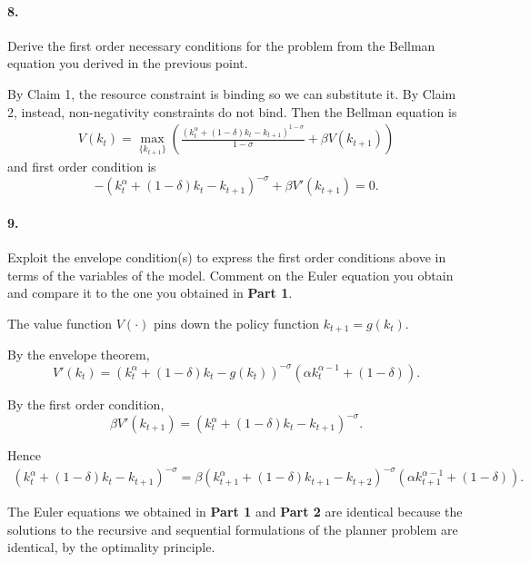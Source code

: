 \documentclass[dvipsnames,11pt]{article}
\begin{document}
\paragraph{8.} Derive the first order necessary conditions for the problem from the Bellman equation you derived in the previous point.  

                \begin{solution}

                    By Claim 1, the resource constraint is binding so we can substitute it. By Claim 2, instead, non-negativity constraints do not bind. Then the Bellman equation is 
\begin{gather*}
V(k_t)=\max_{\{k_{t+1}\}}\left(\frac{(k_t^\alpha+(1-\delta)k_t-k_{t+1})^{1-\sigma}}{1-\sigma}+\beta V(k_{t+1})\right) 
\end{gather*}
and first order condition is 
\begin{equation*}
    -(k_t^\alpha+(1-\delta)k_t-k_{t+1})^{-\sigma}+\beta V'(k_{t+1}) =0.
\end{equation*}
                    
                \end{solution}

\paragraph{9.} Exploit the envelope condition(s) to express the first order conditions above in terms of the variables of the model. Comment on the Euler equation you obtain and compare it to the one you obtained in \textbf{Part 1}.  


                \begin{solution}
The value function $V(\cdot)$ pins down the policy function $k_{t+1}=g(k_t)$. 

\noindent By the envelope theorem, 
\begin{equation*}
    V'(k_t)=(k_t^\alpha+(1-\delta)k_t-g(k_t))^{-\sigma}(\alpha k_t^{\alpha-1}+(1-\delta)).
\end{equation*}

\noindent By the first order condition, 
\begin{equation*}
    \beta V'(k_{t+1})=(k_t^\alpha+(1-\delta)k_t-k_{t+1})^{-\sigma}.
\end{equation*}

\noindent Hence
\begin{gather*}
    (k_t^\alpha+(1-\delta)k_t-k_{t+1})^{-\sigma}=\beta(k_{t+1}^\alpha+(1-\delta)k_{t+1}-k_{t+2})^{-\sigma}(\alpha k_{t+1}^{\alpha-1}+(1-\delta)).
\end{gather*}

The Euler equations we obtained in \textbf{Part 1} and \textbf{Part 2} are identical because the solutions to the recursive and sequential formulations of the planner problem are identical, by the optimality principle. 

                    
                    
                \end{solution}
\end{document}
